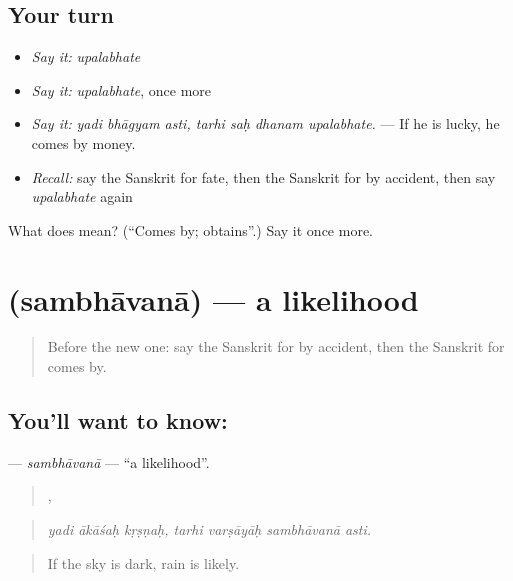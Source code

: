 \subsection*{Your turn}
\begin{itemize}
\raggedright
  \item \emph{Say it:} \emph{upalabhate}
  \item \emph{Say it:} \emph{upalabhate}, once more
  \item \emph{Say it:} \emph{yadi bhāgyam asti, tarhi saḥ dhanam upalabhate.} — If he is lucky, he comes by money.
  \item \emph{Recall:} say the Sanskrit for fate, then the Sanskrit for by accident, then say \emph{upalabhate} again
\end{itemize}

\begin{tcolorbox}[breakable,colback=teal!4,colframe=teal!35!black,title={Before you move on}]
What does  mean? (\textquotedblleft{}Comes by; obtains\textquotedblright{}.) Say it once more.
\end{tcolorbox}
\section[\texorpdfstring{\sk{सम्भावना} (sambhāvanā)}{सम्भावना (sambhāvanā)}]{ (sambhāvanā) — a likelihood}

\label{lesson:SA-C369-sambhavana}



\begin{quote}
Before the new one: say the Sanskrit for by accident, then the Sanskrit for comes by.
\end{quote}

\subsection*{You'll want to know: }
\textbf{} — \emph{sambhāvanā} — \textquotedblleft{}a likelihood\textquotedblright{}.

\begin{quote}
  ,    
\end{quote}

\begin{quote}
\emph{yadi ākāśaḥ kṛṣṇaḥ, tarhi varṣāyāḥ sambhāvanā asti.}
\end{quote}

\begin{quote}
If the sky is dark, rain is likely.
\end{quote}

